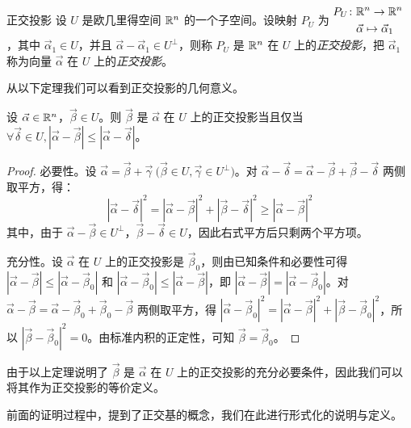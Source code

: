 \begin{definition}{正交投影}
	设 $U$ 是欧几里得空间 $\mathbb R^n$ 的一个子空间。设映射 $P_U$ 为 $\begin{aligned}P_U \colon & \mathbb R^n \to \mathbb R^n \\& \vec \alpha \mapsto \vec \alpha_1 \end{aligned}$，其中 $\vec \alpha_1 \in U$，并且 $\vec \alpha - \vec \alpha_1 \in U^\perp$，则称 $P_U$ 是 $\mathbb R^n$ 在 $U$ 上的\emph{正交投影}，把 $\vec \alpha_1$ 称为向量 $\vec \alpha$ 在 $U$ 上的\emph{正交投影}。
\end{definition}

从以下定理我们可以看到正交投影的几何意义。

\begin{theorem}
	设 $\vec \alpha \in \mathbb R^n$，$\vec \beta \in U$。则 $\vec \beta$ 是 $\vec \alpha$ 在 $U$ 上的正交投影当且仅当 $\forall \vec \delta \in U, |\vec \alpha - \vec \beta| \le |\vec \alpha - \vec \delta|$。
\end{theorem}

\begin{proof}
	必要性。设 $\vec \alpha = \vec \beta + \vec \gamma \pod{\vec \beta \in U, \vec \gamma \in U^\perp}$。对 $\vec \alpha - \vec \delta = \vec \alpha - \vec \beta + \vec \beta - \vec \delta$ 两侧取平方，得：
	$$
	|\vec \alpha - \vec \delta|^2 = |\vec \alpha - \vec \beta|^2 + |\vec \beta - \vec \delta|^2 \ge |\vec \alpha - \vec \beta|^2
	$$
	其中，由于 $\vec \alpha - \vec \beta\in U^\perp$，$\vec \beta - \vec \delta \in U$，因此右式平方后只剩两个平方项。

	充分性。设 $\vec \alpha$ 在 $U$ 上的正交投影是 $\vec \beta_0$，则由已知条件和必要性可得 $|\vec \alpha - \vec \beta| \le |\vec \alpha - \vec \beta_0|$ 和 $|\vec \alpha - \vec \beta_0| \le |\vec \alpha - \vec \beta|$，即 $|\vec \alpha - \vec \beta| = |\vec \alpha - \vec \beta_0|$。对 $\vec \alpha - \vec \beta = \vec \alpha - \vec \beta_0 + \vec \beta_0 - \vec \beta$ 两侧取平方，得 $|\vec \alpha - \vec \beta_0|^2 = |\vec \alpha - \vec \beta|^2 + |\vec \beta - \vec \beta_0|^2$，所以 $|\vec \beta - \vec \beta_0|^2 = 0$。由标准内积的正定性，可知 $\vec \beta = \vec \beta_0$。
\end{proof}

由于以上定理说明了 $\vec \beta$ 是 $\vec \alpha$ 在 $U$ 上的正交投影的充分必要条件，因此我们可以将其作为正交投影的等价定义。

\bigskip

前面的证明过程中，提到了正交基的概念，我们在此进行形式化的说明与定义。

